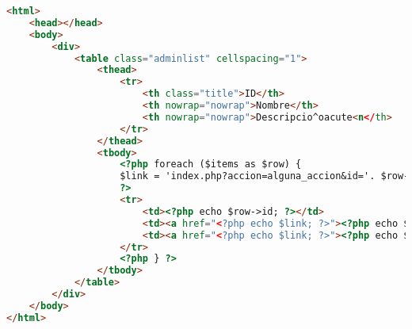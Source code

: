 \begin{lstlisting}[label=mvc_plantilla,caption=Plantilla de la vista,language=HTML]
<html>
	<head></head>
	<body>
		<div>
		    <table class="adminlist" cellspacing="1">
    			<thead>
		        	<tr>
						<th class="title">ID</th>
                		<th nowrap="nowrap">Nombre</th>
		                <th nowrap="nowrap">Descripcio^oacute<n</th>
        		    </tr>
		        </thead>
        		<tbody>
		        	<?php foreach ($items as $row) {
        			$link = 'index.php?accion=alguna_accion&id='. $row->id;
		        	?>
        		    <tr>
                		<td><?php echo $row->id; ?></td>
		                <td><a href="<?php echo $link; ?>"><?php echo $row->nombre; ?></a></td>
        		        <td><a href="<?php echo $link; ?>"><?php echo $row->descripcion; ?></a></td>
		            </tr>
        		    <?php } ?>
		        </tbody>
		    </table>
		</div>
	</body>
</html>
\end{lstlisting}
